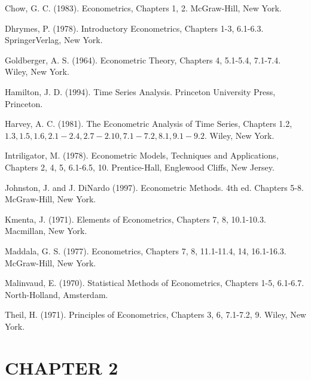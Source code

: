 \documentclass[10pt]{article}
\begin{document}
Chow, G. C. (1983). Econometrics, Chapters 1, 2. McGraw-Hill, New York.

Dhrymes, P. (1978). Introductory Econometrics, Chapters 1-3, 6.1-6.3. SpringerVerlag, New York.

Goldberger, A. S. (1964). Econometric Theory, Chapters 4, 5.1-5.4, 7.1-7.4. Wiley, New York.

Hamilton, J. D. (1994). Time Series Analysis. Princeton University Press, Princeton.

Harvey, A. C. (1981). The Econometric Analysis of Time Series, Chapters 1.2, $1.3,1.5,1.6,2.1-2.4,2.7-2.10,7.1-7.2,8.1,9.1-9.2$. Wiley, New York.

Intriligator, M. (1978). Econometric Models, Techniques and Applications, Chapters 2, 4, 5, 6.1-6.5, 10. Prentice-Hall, Englewood Cliffs, New Jersey.

Johnston, J. and J. DiNardo (1997). Econometric Methods. 4th ed. Chapters 5-8. McGraw-Hill, New York.

Kmenta, J. (1971). Elements of Econometrics, Chapters 7, 8, 10.1-10.3. Macmillan, New York.

Maddala, G. S. (1977). Econometrics, Chapters 7, 8, 11.1-11.4, 14, 16.1-16.3. McGraw-Hill, New York.

Malinvaud, E. (1970). Statistical Methods of Econometrics, Chapters 1-5, 6.1-6.7. North-Holland, Amsterdam.

Theil, H. (1971). Principles of Econometrics, Chapters 3, 6, 7.1-7.2, 9. Wiley, New York.

\section*{CHAPTER 2}
\end{document}
